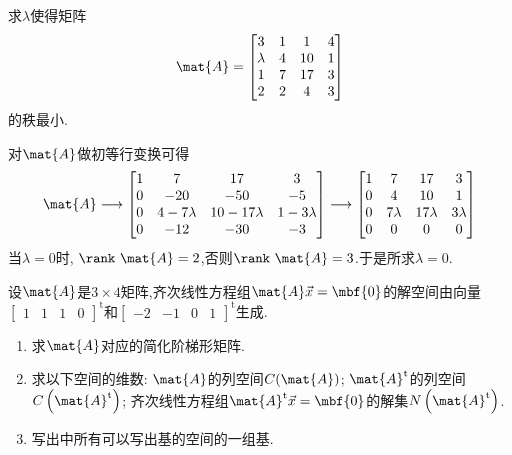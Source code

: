 \documentclass{ctexart}
\begin{document}
\begin{homework}[3(10')]
    求$\lambda$使得矩阵
    \[\mat{A}=\begin{bmatrix}
        3&1&1&4\\
        \lambda&4&10&1\\
        1&7&17&3\\
        2&2&4&3
    \end{bmatrix}\]
    的秩最小.
\end{homework}
\begin{solution}
    对$\mat{A}$做初等行变换可得
    \[\mat{A}\longrightarrow\begin{bmatrix}
        1&7&17&3\\
        0&-20&-50&-5\\
        0&4-7\lambda&10-17\lambda&1-3\lambda\\
        0&-12&-30&-3
    \end{bmatrix}\longrightarrow\begin{bmatrix}
        1&7&17&3\\
        0&4&10&1\\
        0&7\lambda&17\lambda&3\lambda\\
        0&0&0&0
    \end{bmatrix}\]
    当$\lambda=0$时, $\rank\ \mat{A}=2$,否则$\rank\ \mat{A}=3$.于是所求$\lambda=0$.
\end{solution}
\begin{homework}[4(20')]
    设$\mat{A}$是$3\times4$矩阵,齐次线性方程组$\mat{A}\vec{x}=\mbf{0}$的解空间由向量$\begin{bmatrix}
        1&1&1&0
    \end{bmatrix}^{\text{t}}$和$\begin{bmatrix}
        -2&-1&0&1
    \end{bmatrix}^{\text{t}}$生成.
    \begin{enumerate}[label=\tbf{(\arabic*)},topsep=0pt,parsep=0pt,itemsep=0pt,partopsep=0pt]
        \item 求$\mat{A}$对应的简化阶梯形矩阵.
        \item 求以下空间的维数:  $\mat{A}$的列空间$C(\mat{A})$;  $\mat{A}^{\text{t}}$的列空间$C\left(\mat{A}^{\text{t}}\right)$; 齐次线性方程组$\mat{A}^{\text{t}}\vec{x}=\mbf{0}$的解集$N\left(\mat{A}^{\text{t}}\right)$.
        \item 写出中所有可以写出基的空间的一组基.
    \end{enumerate}
\end{homework}
\end{document}
